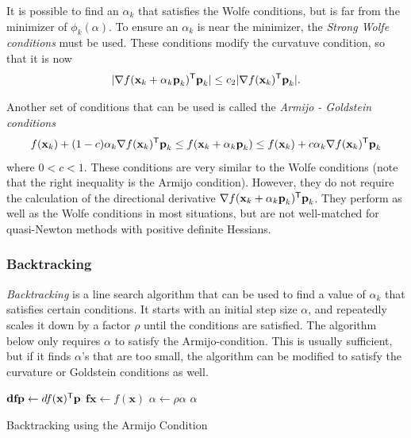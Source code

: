 It is possible to find an $\alpha_k$ that satisfies the Wolfe conditions, but is far from the minimizer of $\phi_k(\alpha)$.
To ensure an $\alpha_k$ is near the minimizer, the \emph{Strong Wolfe conditions} must be used.
These conditions modify the curvatuve condition, so that it is now
$$ |\nabla f(\textbf{x}_k + \alpha_k \textbf{p}_k)^{\mathsf T} \textbf{p}_k| \leq c_2|\nabla f(\textbf{x}_k)^{\mathsf T} \textbf{p}_k|.$$

Another set of conditions that can be used is called the \emph{Armijo - Goldstein conditions}
$$ f(\textbf{x}_k) + (1 - c)\alpha_k\nabla f(\textbf{x}_k)^{\mathsf T} \textbf{p}_k \leq f(\textbf{x}_k + \alpha_k\textbf{p}_k) \leq f(\textbf{x}_k) + c\alpha_k\nabla f(\textbf{x}_k)^{\mathsf T}\textbf{p}_k$$
where $0 < c < 1$.
These conditions are very similar to the Wolfe conditions (note that the right inequality is the Armijo condition). 
However, they do not require the calculation of the directional derivative $\nabla f(\textbf{x}_k + \alpha_k \textbf{p}_k)^{\mathsf T}\textbf{p}_k$.
They perform as well as the Wolfe conditions in most situations, but are not well-matched for quasi-Newton methods with positive definite Hessians.

\subsubsection*{Backtracking} %

\emph{Backtracking} is a line search algorithm that can be used to find a value of $\alpha_k$ that satisfies certain conditions.
It starts with an initial step size $\alpha$, and repeatedly scales it down by a factor $\rho$ until the conditions are satisfied.
The algorithm below only requires $\alpha$ to satisfy the Armijo-condition.
This is usually sufficient, but if it finds $\alpha$'s that are too small, the algorithm can be modified to satisfy the curvature or Goldstein conditions as well.

\begin{algorithm}[H]
\begin{algorithmic}[1]
	\State $\textbf{dfp}\gets df(\textbf{x})^{\mathsf T}\textbf{p}$
	\State $\textbf{fx}\gets f(\textbf{x})$
		\State $\alpha \gets \rho\alpha$
	\EndWhile
	\Return $\alpha$
\EndProcedure
\end{algorithmic}
\caption{Backtracking using the Armijo Condition}
\label{Alg:backtracking}
\end{algorithm}

